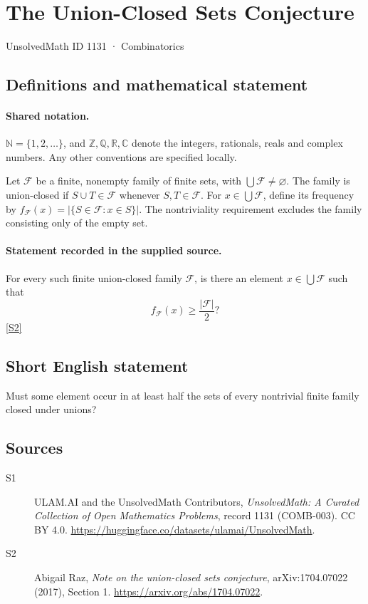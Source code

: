 \documentclass[11pt]{article}
\newcommand{\sref}[2]{\hyperlink{source:#1:#2}{[S#2]}}
\begin{document}
\setcounter{section}{1130}
\section{The Union-Closed Sets Conjecture}\label{1131}
{\small\sffamily UnsolvedMath ID 1131 · Combinatorics}
\subsection{Definitions and mathematical statement}

\paragraph{Shared notation.}$\mathbb N=\{1,2,\ldots\}$, and $\mathbb Z,\mathbb Q,\mathbb R,\mathbb C$ denote the integers, rationals, reals and complex numbers. Any other conventions are specified locally.


Let \(\mathcal F\) be a finite, nonempty family of finite sets,
with \(\bigcup\mathcal F\ne\varnothing\).
The family is union-closed if \(S\cup T\in\mathcal F\) whenever
\(S,T\in\mathcal F\).  For \(x\in\bigcup\mathcal F\), define its frequency
by \(f_{\mathcal F}(x)=|\{S\in\mathcal F:x\in S\}|\).
The nontriviality requirement excludes the family consisting only of
the empty set.
\paragraph{Statement recorded in the supplied source.}
For every such finite union-closed family \(\mathcal F\), is there
an element \(x\in\bigcup\mathcal F\) such that
\[
 f_{\mathcal F}(x)\ge\frac{|\mathcal F|}{2}?
\] \sref{1131}{2}
\subsection{Short English statement}
Must some element occur in at least half the sets of every nontrivial finite family closed under unions?
\subsection{Sources}
\begin{description}
\item[\hypertarget{source:1131:1}{S1}] ULAM.AI and the UnsolvedMath Contributors, \emph{UnsolvedMath: A Curated Collection of Open Mathematics Problems}, record 1131 (COMB-003). CC BY 4.0. \url{https://huggingface.co/datasets/ulamai/UnsolvedMath}.
\item[\hypertarget{source:1131:2}{S2}] Abigail Raz, \emph{Note on the union-closed sets conjecture}, arXiv:1704.07022 (2017), Section 1. \url{https://arxiv.org/abs/1704.07022}.
\end{description}
\label{end:1131}
\end{document}
